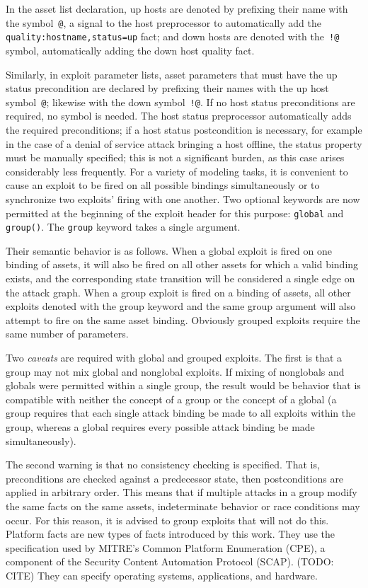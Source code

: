 In the asset list declaration, up hosts are denoted by prefixing their name with
the symbol~\texttt{@}, a signal to the host preprocessor to automatically add
the \texttt{quality:hostname,status=up} fact; and down hosts are denoted with
the~\texttt{!@} symbol, automatically adding the down host quality fact.

Similarly, in exploit parameter lists, asset parameters that must have the
up status precondition are declared by prefixing their names with the up host 
symbol~\texttt{@}; likewise with the down symbol~\texttt{!@}. If no host
status preconditions are required, no symbol is needed. The host status
preprocessor automatically adds the required preconditions; if a host status
postcondition is necessary, for example in the case of a denial of service
attack bringing a host offline, the status property must be manually specified;
this is not a significant burden, as this case arises considerably less
frequently.
For a variety of modeling tasks, it is convenient to cause an exploit to be
fired on all possible bindings simultaneously or to synchronize two exploits'
firing with one another. Two optional keywords are now permitted at the beginning
of the exploit header for this purpose: \texttt{global} and \texttt{group()}.
The \texttt{group} keyword takes a single argument.

Their semantic behavior
is as follows. When a global exploit is fired on one binding of assets, it will
also be fired on all other assets for which a valid binding exists, and the
corresponding state transition will be considered a single edge on the attack
graph. When a group exploit is fired on a binding of assets, all other exploits
denoted with the group keyword and the same group argument will also attempt
to fire on the same asset binding. Obviously grouped exploits require the same
number of parameters.

Two \emph{caveats} are required with global and grouped exploits. The first
is that a group may not mix global and nonglobal exploits. If mixing of
nonglobals and globals were permitted within a single group, the result would
be behavior that is compatible with neither the concept of a group or the
concept of a global (a group requires that each single attack binding be made
to all exploits within the group, whereas a global requires every possible
attack binding be made simultaneously).

The second warning is that no consistency checking is specified. That is,
preconditions are checked against a predecessor state, then postconditions
are applied in arbitrary order. This means that if multiple attacks in a group
modify the same facts on the same assets, indeterminate behavior or race
conditions may occur. For this reason, it is advised to group exploits that
will not do this.
Platform facts are new types of facts introduced by this work. They use the
specification used by MITRE's Common Platform Enumeration (CPE), a component
of the Security Content Automation Protocol (SCAP). (TODO: CITE)
They can specify operating systems, applications, and hardware.

